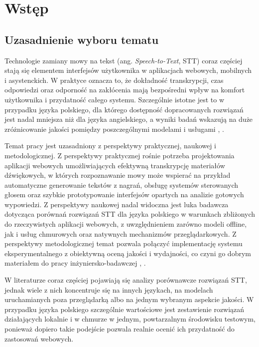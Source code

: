 \section*{Wstęp}

\subsection*{Uzasadnienie wyboru tematu}


Technologie zamiany mowy na tekst (ang. \textit{Speech-to-Text}, STT) coraz częściej stają się elementem interfejsów użytkownika w aplikacjach webowych, mobilnych i asystenckich. W praktyce oznacza to, że dokładność transkrypcji, czas odpowiedzi oraz odporność na zakłócenia mają bezpośredni wpływ na komfort użytkownika i przydatność całego systemu. Szczególnie istotne jest to w przypadku języka polskiego, dla którego dostępność dopracowanych rozwiązań jest nadal mniejsza niż dla języka angielskiego, a wyniki badań wskazują na duże zróżnicowanie jakości pomiędzy poszczególnymi modelami i usługami \cite[s.~315--321]{pondel2024e2e}, \cite[s.~1--12]{ferraro2023benchmarking}.

Temat pracy jest uzasadniony z perspektywy praktycznej, naukowej i metodologicznej. Z perspektywy praktycznej rośnie potrzeba projektowania aplikacji webowych umożliwiających efektywną transkrypcję materiałów dźwiękowych, w których rozpoznawanie mowy może wspierać na przykład automatyczne generowanie tekstów z nagrań, obsługę systemów sterowanych głosem oraz szybkie prototypowanie interfejsów opartych na analizie gotowych wypowiedzi. Z perspektywy naukowej nadal widoczna jest luka badawcza dotycząca porównań rozwiązań STT dla języka polskiego w warunkach zbliżonych do rzeczywistych aplikacji webowych, z uwzględnieniem zarówno modeli offline, jak i usług chmurowych oraz natywnych mechanizmów przeglądarkowych. Z perspektywy metodologicznej temat pozwala połączyć implementację systemu eksperymentalnego z obiektywną oceną jakości i wydajności, co czyni go dobrym materiałem do pracy inżyniersko-badawczej \cite[s.~314--318]{chlewicki2024potencjal}, \cite[s.~14--18]{pudo2024optimizing}.

W literaturze coraz częściej pojawiają się analizy porównawcze rozwiązań STT, jednak wiele z nich koncentruje się na innych językach, na modelach uruchamianych poza przeglądarką albo na jednym wybranym aspekcie jakości. W przypadku języka polskiego szczególnie wartościowe jest zestawienie rozwiązań działających lokalnie i w chmurze w jednym, powtarzalnym środowisku testowym, ponieważ dopiero takie podejście pozwala realnie ocenić ich przydatność do zastosowań webowych.

